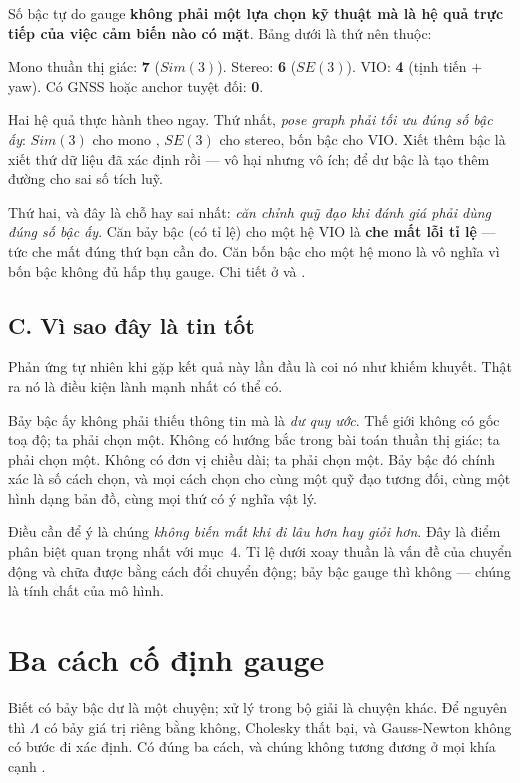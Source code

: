 \documentclass[../../vslam.tex]{subfiles}
\begin{document}
\begin{cannho}
Số bậc tự do gauge \textbf{không phải một lựa chọn kỹ thuật mà là hệ quả trực tiếp của việc cảm biến nào có mặt}. Bảng dưới là thứ nên thuộc:

Mono thuần thị giác: \textbf{7} (\(Sim(3)\)). Stereo: \textbf{6} (\(SE(3)\)). VIO: \textbf{4} (tịnh tiến \(+\) yaw). Có GNSS hoặc anchor tuyệt đối: \textbf{0}.

Hai hệ quả thực hành theo ngay. Thứ nhất, \emph{pose graph phải tối ưu đúng số bậc ấy}: \(Sim(3)\) cho mono \cite{strasdat2010scaledrift}, \(SE(3)\) cho stereo, bốn bậc cho VIO. Xiết thêm bậc là xiết thứ dữ liệu đã xác định rồi --- vô hại nhưng vô ích; để dư bậc là tạo thêm đường cho sai số tích luỹ.

Thứ hai, và đây là chỗ hay sai nhất: \emph{căn chỉnh quỹ đạo khi đánh giá phải dùng đúng số bậc ấy}. Căn bảy bậc (có tỉ lệ) cho một hệ VIO là \textbf{che mất lỗi tỉ lệ} --- tức che mất đúng thứ bạn cần đo. Căn bốn bậc cho một hệ mono là vô nghĩa vì bốn bậc không đủ hấp thụ gauge. Chi tiết ở  và \cite{zhang2018trajeval}.
\end{cannho}

\subsection{C. Vì sao đây là tin tốt}

Phản ứng tự nhiên khi gặp kết quả này lần đầu là coi nó như khiếm khuyết. Thật ra nó là điều kiện lành mạnh nhất có thể có.

Bảy bậc ấy không phải thiếu thông tin mà là \emph{dư quy ước}. Thế giới không có gốc toạ độ; ta phải chọn một. Không có hướng bắc trong bài toán thuần thị giác; ta phải chọn một. Không có đơn vị chiều dài; ta phải chọn một. Bảy bậc đó chính xác là số cách chọn, và mọi cách chọn cho cùng một quỹ đạo tương đối, cùng một hình dạng bản đồ, cùng mọi thứ có ý nghĩa vật lý.

Điều cần để ý là chúng \emph{không biến mất khi đi lâu hơn hay giỏi hơn}. Đây là điểm phân biệt quan trọng nhất với mục~4. Tỉ lệ dưới xoay thuần là vấn đề của chuyển động và chữa được bằng cách đổi chuyển động; bảy bậc gauge thì không --- chúng là tính chất của mô hình.

\section{Ba cách cố định gauge}

Biết có bảy bậc dư là một chuyện; xử lý trong bộ giải là chuyện khác. Để nguyên thì \(\Lambda\) có bảy giá trị riêng bằng không, Cholesky thất bại, và Gauss-Newton không có bước đi xác định. Có đúng ba cách, và chúng không tương đương ở mọi khía cạnh \cite{zhang2018gaugeba}.
\end{document}
